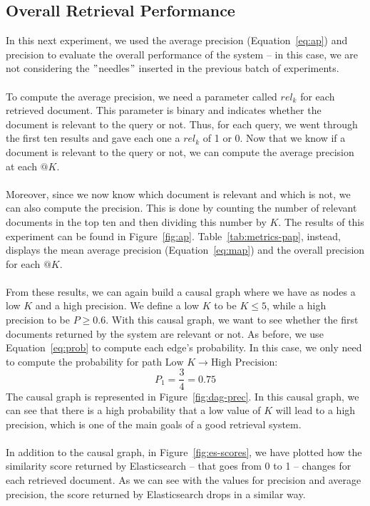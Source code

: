 \subsection{Overall Retrieval Performance}\label{subsec:overall-retrieval-performance}
In this next experiment, we used the average precision (Equation~\ref{eq:ap}) and precision to evaluate the overall performance of the system -- in this case, we are not considering the \("\)needles\("\) inserted in the previous batch of experiments. \\ \\
To compute the average precision, we need a parameter called $rel_k$ for each retrieved document.
This parameter is binary and indicates whether the document is relevant to the query or not.
Thus, for each query, we went through the first ten results and gave each one a $rel_k$ of 1 or 0.
Now that we know if a document is relevant to the query or not, we can compute the average precision at each $@K$. \\ \\
Moreover, since we now know which document is relevant and which is not, we can also compute the precision.
This is done by counting the number of relevant documents in the top ten and then dividing this number by $K$.
The results of this experiment can be found in Figure~\ref{fig:ap}.
Table~\ref{tab:metrics-pap}, instead, displays the mean average precision (Equation~\ref{eq:map}) and the overall precision for each $@K$. \\ \\
From these results, we can again build a causal graph where we have as nodes a low $K$ and a high precision.
We define a low $K$ to be $K\leq5$, while a high precision to be $P\geq0.6$.
With this causal graph, we want to see whether the first documents returned by the system are relevant or not.
As before, we use Equation~\ref{eq:prob} to compute each edge's probability.
In this case, we only need to compute the probability for path $\text{Low $K$} \rightarrow \text{High Precision}$:
\[P_1 = \frac{3}{4} = 0.75\]
The causal graph is represented in Figure~\ref{fig:dag-prec}.
In this causal graph, we can see that there is a high probability that a low value of $K$ will lead to a high precision, which is one of the main goals of a good retrieval system. \\ \\
In addition to the causal graph, in Figure~\ref{fig:es-scores}, we have plotted how the similarity score returned by Elasticsearch -- that goes from 0 to 1 -- changes for each retrieved document.
As we can see with the values for precision and average precision, the score returned by Elasticsearch drops in a similar way.


